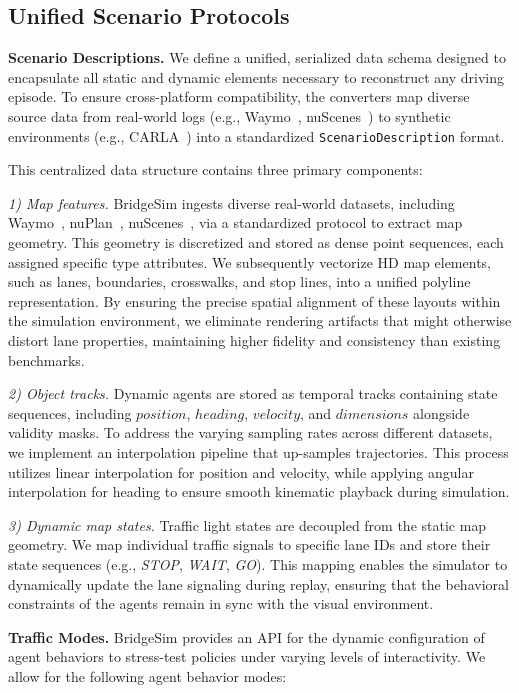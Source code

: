 \documentclass{article}
\begin{document}
\subsection{Unified Scenario Protocols} 
\textbf{Scenario Descriptions.} We define a unified, serialized data schema designed to encapsulate all static and dynamic elements necessary to reconstruct any driving episode. To ensure cross-platform compatibility, the converters map diverse source data from real-world logs (e.g., Waymo~\cite{mei2022waymo}, nuScenes~\cite{caesar2020nuscenes}) to synthetic environments (e.g., CARLA~\cite{jia2024bench}) into a standardized \texttt{ScenarioDescription} format.

This centralized data structure contains three primary components:

\textit{1) Map features.} BridgeSim ingests diverse real-world datasets, including Waymo~\cite{mei2022waymo}, nuPlan~\cite{caesar2021nuplan}, nuScenes~\cite{caesar2020nuscenes}, via a standardized protocol to extract map geometry. This geometry is discretized and stored as dense point sequences, each assigned specific type attributes. We subsequently vectorize HD map elements, such as lanes, boundaries, crosswalks, and stop lines, into a unified polyline representation. By ensuring the precise spatial alignment of these layouts within the simulation environment, we eliminate rendering artifacts that might otherwise distort lane properties, maintaining higher fidelity and consistency than existing benchmarks.

\textit{2) Object tracks.} Dynamic agents are stored as temporal tracks containing state sequences, including $position$, $heading$, $velocity$, and $dimensions$ alongside validity masks. To address the varying sampling rates across different datasets, we implement an interpolation pipeline that up-samples trajectories. This process utilizes linear interpolation for position and velocity, while applying angular interpolation for heading to ensure smooth kinematic playback during simulation.

\textit{3) Dynamic map states.} Traffic light states are decoupled from the static map geometry. We map individual traffic signals to specific lane IDs and store their state sequences (e.g., \textit{STOP}, \textit{WAIT}, \textit{GO}). This mapping enables the simulator to dynamically update the lane signaling during replay, ensuring that the behavioral constraints of the agents remain in sync with the visual environment.

\textbf{Traffic Modes.} BridgeSim provides an API for the dynamic configuration of agent behaviors to stress-test policies under varying levels of interactivity. We allow for the following agent behavior modes:
\end{document}
